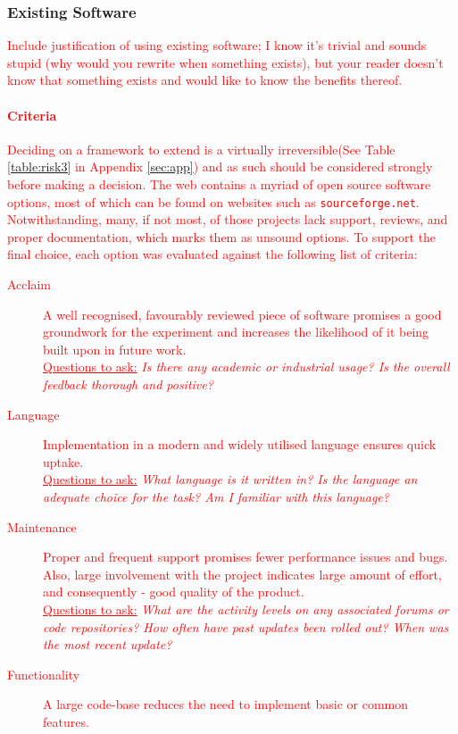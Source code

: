 \documentclass[12pt,a4,xcolor=table]{article}
\begin{document}
	\subsubsection{Existing Software}
\textcolor{red}{	
	Include justification of using existing software; I know it's trivial and sounds stupid (why would you rewrite when something exists), but your reader doesn't know that something exists and would like to know the benefits thereof.
	\paragraph{Criteria}
	Deciding on a framework to extend is a virtually irreversible(See Table \ref{table:risk3} in Appendix \ref{sec:app}) and as such should be considered strongly before making a decision. The web contains a myriad of open source software options, most of which can be found on websites such as \texttt{sourceforge.net}. Notwithstanding, many, if not most, of those projects lack support, reviews, and proper documentation, which marks them as unsound options. To support the final choice, each option was evaluated against the following list of criteria:
	\begin{description}
		\item[Acclaim] A well recognised, favourably reviewed piece of software promises a good groundwork for the experiment and increases the likelihood of it being built upon in future work.\\
		\underline{Questions to ask:} \textit{Is there any academic or industrial usage? Is the overall feedback thorough and positive?}
		\item[Language] Implementation in a modern and widely utilised language ensures quick uptake.\\
		\underline{Questions to ask:} \textit{What language is it written in? Is the language an adequate choice for the task? Am I familiar with this language? }
		\item[Maintenance] Proper and frequent support promises fewer performance issues and bugs. Also, large involvement with the project indicates large amount of effort, and consequently - good quality of the product.\\
		\underline{Questions to ask:} \textit{What are the activity levels on any associated forums or code repositories? How often have past updates been rolled out? When was the most recent update?}
		\item[Functionality] A large code-base reduces the need to implement basic or common features.\\

\end{description}}
\end{document}

